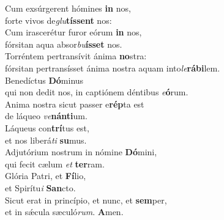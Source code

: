 \evenverse Cum exsúrgerent hómines \textbf{in} nos,~\*\\
\evenverse forte vivos de\textit{glu}\textbf{tís}\textbf{sent} nos:\\
\oddverse Cum irascerétur furor eórum \textbf{in} nos,~\*\\
\oddverse fórsitan aqua absor\textit{bu}\textbf{ís}\textbf{set} nos.\\
\evenverse Torréntem pertransívit ánima \textbf{no}stra:~\*\\
\evenverse fórsitan pertransísset ánima nostra aquam into\textit{le}\textbf{rá}\textbf{bi}lem.\\
\oddverse Benedíctus \textbf{Dó}minus~\*\\
\oddverse qui non dedit nos, in captiónem déntibus \textit{e}\textbf{ó}rum.\\
\evenverse Anima nostra sicut passer e\textbf{rép}ta est~\*\\
\evenverse de láqueo \textit{ve}\textbf{nán}\textbf{ti}um.\\
\oddverse Láqueus con\textbf{trí}tus est,~\*\\
\oddverse et nos liberá\textit{ti} \textbf{su}mus.\\
\evenverse Adjutórium nostrum in nómine \textbf{Dó}mini,~\*\\
\evenverse qui fecit cælum \textit{et} \textbf{ter}ram.\\
\oddverse Glória Patri, et \textbf{Fí}lio,~\*\\
\oddverse et Spirítu\textit{i} \textbf{San}cto.\\
\evenverse Sicut erat in princípio, et nunc, et \textbf{sem}per,~\*\\
\evenverse et in sǽcula sæculó\textit{rum}. \textbf{A}men.\\
